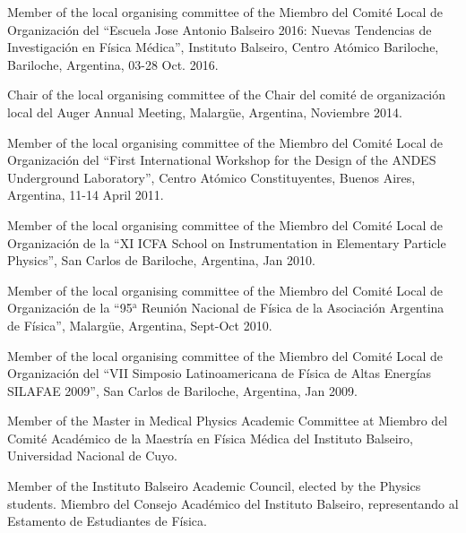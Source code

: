 \ifeng
Member of the local organising committee of the 
\else
Miembro del Comité Local de Organización del 
\fi
``Escuela Jose Antonio Balseiro 2016: Nuevas Tendencias de Investigación en Física Médica'', Instituto Balseiro, Centro Atómico Bariloche, Bariloche, Argentina, 03-28 Oct. 2016.

\ifeng
Chair of the local organising committee of the
\else
Chair del comité de organización local del
\fi
Auger Annual Meeting, Malargüe, Argentina, Noviembre 2014.

\ifeng
Member of the local organising committee of the 
\else
Miembro del Comité Local de Organización del 
\fi
``First International Workshop for the Design of the ANDES Underground Laboratory'', Centro Atómico Constituyentes, Buenos Aires, Argentina, 11-14 April 2011.

\ifeng
Member of the local organising committee of the 
\else
Miembro del Comité Local de Organización de la 
\fi
``XI ICFA School on Instrumentation in Elementary Particle Physics'', San Carlos de Bariloche, Argentina, Jan 2010.

\ifeng
Member of the local organising committee of the 
\else
Miembro del Comité Local de Organización de la 
\fi
``95$^{\mathrm{a}}$ Reunión Nacional de Física de la Asociación Argentina de Física'', Malargüe, Argentina, Sept-Oct 2010.

\ifeng
Member of the local organising committee of the 
\else
Miembro del Comité Local de Organización del
\fi
``VII Simposio Latinoamericana de Física de Altas Energías SILAFAE 2009'', San Carlos de Bariloche, Argentina, Jan 2009.

\ifeng
Member of the Master in Medical Physics Academic Committee at
\else
Miembro del Comité Académico de la Maestría en Física Médica del
\fi
 Instituto Balseiro, Universidad Nacional de Cuyo.

\ifeng
Member of the Instituto Balseiro Academic Council, elected by the Physics students.
\else
Miembro del Consejo Académico del Instituto Balseiro, representando al Estamento de Estudiantes de Física.
\fi
